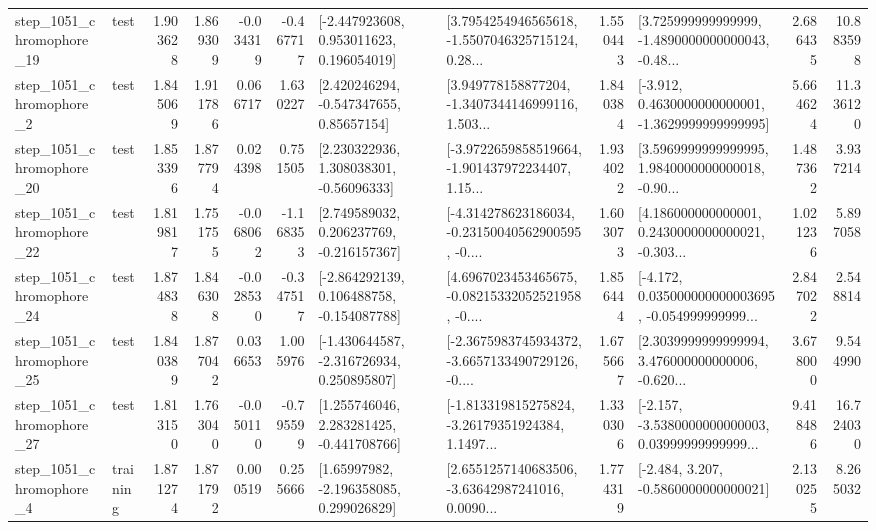 \begin{tabular}{llrrrrllrlrr}
 step\_1051\_chromophore\_19 &      test &      1.903628 &    1.869309 &     -0.034319 & -0.467717 &    [-2.447923608, 0.953011623, 0.196054019] &  [3.7954254946565618, -1.5507046325715124, 0.28... &       1.550443 &  [3.725999999999999, -1.4890000000000043, -0.48... &            2.686435 &         10.883598 \\
  step\_1051\_chromophore\_2 &      test &      1.845069 &    1.911786 &      0.066717 &  1.630227 &     [2.420246294, -0.547347655, 0.85657154] &  [3.949778158877204, -1.3407344146999116, 1.503... &       1.840384 &  [-3.912, 0.4630000000000001, -1.3629999999999995] &            5.664624 &         11.336120 \\
 step\_1051\_chromophore\_20 &      test &      1.853396 &    1.877794 &      0.024398 &  0.751505 &     [2.230322936, 1.308038301, -0.56096333] &  [-3.9722659858519664, -1.901437972234407, 1.15... &       1.934022 &  [3.5969999999999995, 1.9840000000000018, -0.90... &            1.487362 &          3.937214 \\
 step\_1051\_chromophore\_22 &      test &      1.819817 &    1.751755 &     -0.068062 & -1.168353 &    [2.749589032, 0.206237769, -0.216157367] &  [-4.314278623186034, -0.23150040562900595, -0.... &       1.603073 &  [4.186000000000001, 0.2430000000000021, -0.303... &            1.021236 &          5.897058 \\
 step\_1051\_chromophore\_24 &      test &      1.874838 &    1.846308 &     -0.028530 & -0.347517 &   [-2.864292139, 0.106488758, -0.154087788] &  [4.6967023453465675, -0.08215332052521958, -0.... &       1.856444 &  [-4.172, 0.035000000000003695, -0.054999999999... &            2.847022 &          2.548814 \\
 step\_1051\_chromophore\_25 &      test &      1.840389 &    1.877042 &      0.036653 &  1.005976 &   [-1.430644587, -2.316726934, 0.250895807] &  [-2.3675983745934372, -3.6657133490729126, -0.... &       1.675667 &  [2.3039999999999994, 3.476000000000006, -0.620... &            3.678000 &          9.544990 \\
 step\_1051\_chromophore\_27 &      test &      1.813150 &    1.763040 &     -0.050110 & -0.795599 &    [1.255746046, 2.283281425, -0.441708766] &  [-1.813319815275824, -3.26179351924384, 1.1497... &       1.330306 &  [-2.157, -3.5380000000000003, 0.03999999999999... &            9.418486 &         16.724030 \\
  step\_1051\_chromophore\_4 &  training &      1.871274 &    1.871792 &      0.000519 &  0.255666 &     [1.65997982, -2.196358085, 0.299026829] &  [2.6551257140683506, -3.63642987241016, 0.0090... &       1.774319 &               [-2.484, 3.207, -0.5860000000000021] &            2.130255 &          8.265032 \\

\end{tabular}
